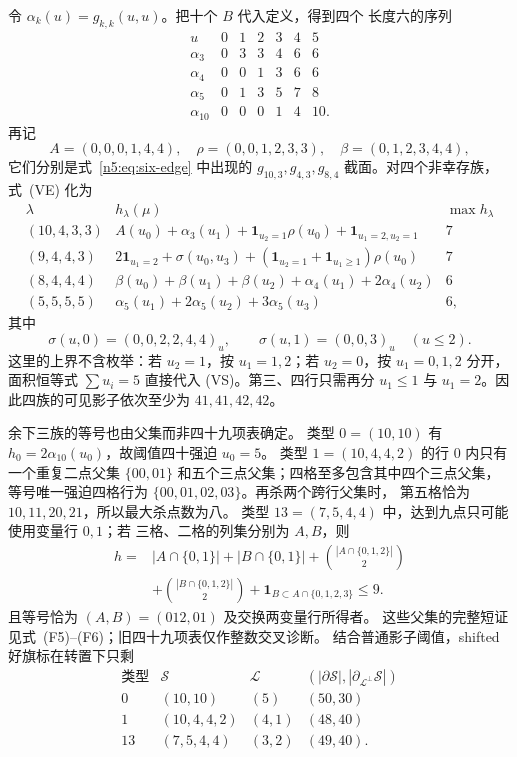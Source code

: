 令 \(\alpha_k(u)=g_{k,k}(u,u)\)。把十个 \(B\) 代入定义，得到四个
长度六的序列
\[
\begin{array}{c|rrrrrr}
u&0&1&2&3&4&5\\ \hline
\alpha_3&0&3&3&4&6&6\\
\alpha_4&0&0&1&3&6&6\\
\alpha_5&0&1&3&5&7&8\\
\alpha_{10}&0&0&0&1&4&10.
\end{array}                                                     \tag{VS}
\]
再记
\[
A=(0,0,0,1,4,4),\quad \rho=(0,0,1,2,3,3),\quad
\beta=(0,1,2,3,4,4),
\]
它们分别是式~\eqref{n5:eq:six-edge} 中出现的
\(g_{10,3},g_{4,3},g_{8,4}\) 截面。对四个非幸存族，式~(VE) 化为
\[
\begin{array}{c|l|c}
\lambda&h_\lambda(\mu)&\max h_\lambda\\ \hline
(10,4,3,3)&A(u_0)+\alpha_3(u_1)
 +\mathbf1_{u_2=1}\rho(u_0)+\mathbf1_{u_1=2,u_2=1}&7\\
(9,4,4,3)&2\mathbf1_{u_1=2}+\sigma(u_0,u_3)
 +(\mathbf1_{u_2=1}+\mathbf1_{u_1\ge1})\rho(u_0)&7\\
(8,4,4,4)&\beta(u_0)+\beta(u_1)+\beta(u_2)
 +\alpha_4(u_1)+2\alpha_4(u_2)&6\\
(5,5,5,5)&\alpha_5(u_1)+2\alpha_5(u_2)+3\alpha_5(u_3)&6,
\end{array}                                                     \tag{VB}
\]
其中
\[
 \sigma(u,0)=(0,0,2,2,4,4)_u,\qquad
 \sigma(u,1)=(0,0,3)_u\quad(u\le2).
\]
这里的上界不含枚举：若 \(u_2=1\)，按 \(u_1=1,2\)；若
\(u_2=0\)，按 \(u_1=0,1,2\) 分开，面积恒等式
\(\sum u_i=5\) 直接代入 (VS)。第三、四行只需再分
\(u_1\le1\) 与 \(u_1=2\)。因此四族的可见影子依次至少为
\(41,41,42,42\)。

余下三族的等号也由父集而非四十九项表确定。
类型 \(0=(10,10)\) 有
\(h_0=2\alpha_{10}(u_0)\)，故阈值四十强迫 \(u_0=5\)。
类型 \(1=(10,4,4,2)\) 的行 \(0\) 内只有一个重复二点父集
\(\{00,01\}\) 和五个三点父集；四格至多包含其中四个三点父集，
等号唯一强迫四格行为 \(\{00,01,02,03\}\)。再杀两个跨行父集时，
第五格恰为 \(10,11,20,21\)，所以最大杀点数为八。
类型 \(13=(7,5,4,4)\) 中，达到九点只可能使用变量行 \(0,1\)；若
三格、二格的列集分别为 \(A,B\)，则
\[
\begin{aligned}
h={}&|A\cap\{0,1\}|+|B\cap\{0,1\}|
 +\binom{|A\cap\{0,1,2\}|}{2}\\
&+\binom{|B\cap\{0,1,2\}|}{2}
 +\mathbf1_{B\subset A\cap\{0,1,2,3\}}\le9.
\end{aligned}
\]
且等号恰为 \((A,B)=(012,01)\) 及交换两变量行所得者。
这些父集的完整短证见式~(F5)--(F6)；旧四十九项表仅作整数交叉诊断。
结合普通影子阈值，shifted 好旗标在转置下只剩
\begin{equation}\label{n5:eq:survivors}
\begin{array}{c|c|c|c}
\text{类型}&\mathcal S&\mathcal L&
(|\partial\mathcal S|,|\partial_{\mathcal L^\perp}\mathcal S|)\\ \hline
0&(10,10)&(5)&(50,30)\\
1&(10,4,4,2)&(4,1)&(48,40)\\
13&(7,5,4,4)&(3,2)&(49,40).
\end{array}
\end{equation}

